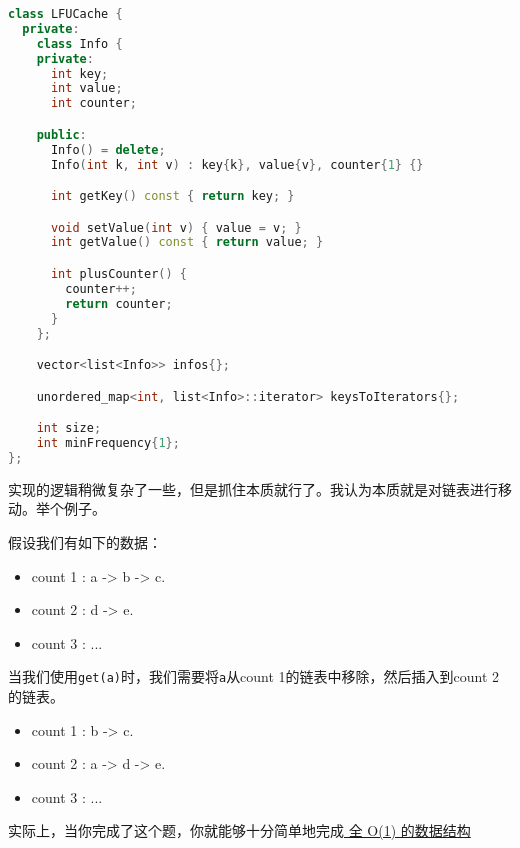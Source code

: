 \documentclass[../../main.tex]{subfiles}
\begin{document}
\begin{lstlisting}[language=C++,style=kaolstplain]
class LFUCache {
  private:
    class Info {
    private:
      int key;
      int value;
      int counter;

    public:
      Info() = delete;
      Info(int k, int v) : key{k}, value{v}, counter{1} {}

      int getKey() const { return key; }

      void setValue(int v) { value = v; }
      int getValue() const { return value; }

      int plusCounter() {
        counter++;
        return counter;
      }
    };

    vector<list<Info>> infos{};

    unordered_map<int, list<Info>::iterator> keysToIterators{};

    int size;
    int minFrequency{1};
};
\end{lstlisting}

实现的逻辑稍微复杂了一些，但是抓住本质就行了。我认为本质就是对链表进行移动。举个例子。

\begin{example}
  假设我们有如下的数据：

  \begin{itemize}
    \item count 1 : a -> b -> c.
    \item count 2 : d -> e.
    \item count 3 : ...
  \end{itemize}

  当我们使用\texttt{get(a)}时，我们需要将\texttt{a}从count 1的链表中移除，然后插入到count 2的链表。


  \begin{itemize}
    \item count 1 : b -> c.
    \item count 2 : a -> d -> e.
    \item count 3 : ...
  \end{itemize}

\end{example}



\begin{kaobox}[title=类似题目]
  实际上，当你完成了这个题，你就能够十分简单地完成\href{https://leetcode.cn/problems/all-oone-data-structure/}{
    全 O(1) 的数据结构}
\end{kaobox}
\end{document}
